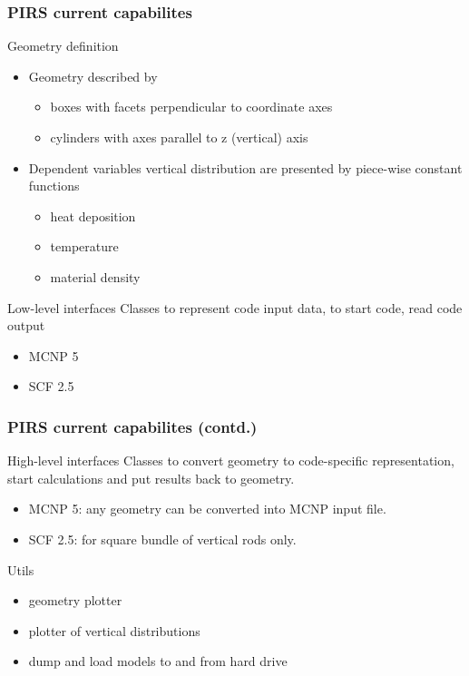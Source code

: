 \begin{frame}[fragile]
    \frametitle{PIRS current capabilites}

    \begin{block}{Geometry definition}
    \begin{itemize}
        \item Geometry described by 
            \begin{itemize}
                \item boxes with facets perpendicular to coordinate axes
                \item cylinders with axes parallel to z (vertical) axis
            \end{itemize}
        \item Dependent variables vertical distribution are presented by piece-wise constant functions
            \begin{itemize}
                \item heat deposition
                \item temperature
                \item material density
            \end{itemize}
    \end{itemize}
    \end{block}

    \begin{block}{Low-level interfaces}
    Classes to represent code input data, to start code, read code output
    \begin{itemize}
        \item MCNP 5
        \item SCF 2.5
    \end{itemize}
    \end{block}
\end{frame}

\begin{frame}[fragile]
    \frametitle{PIRS current capabilites (contd.)}
    \begin{block}{High-level interfaces}
    Classes to convert geometry to code-specific representation, start calculations and 
    put results back to geometry.
    \begin{itemize}
        \item MCNP 5: any geometry can be converted into MCNP input file. 
        \item SCF 2.5: for square bundle of vertical rods only. 
    \end{itemize}
    \end{block}

    \begin{block}{Utils}
    \begin{itemize}
        \item geometry plotter
        \item plotter of vertical distributions
        \item dump and load models to and from hard drive    
    \end{itemize}
    \end{block}
\end{frame}
